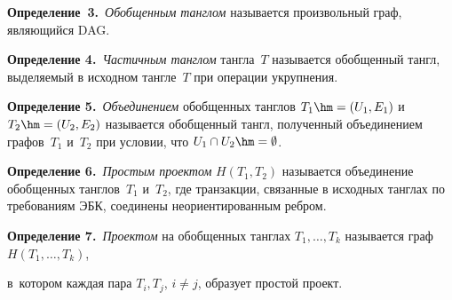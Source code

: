   \noindent


  \textbf{Определение~3.}\ \textit{Обобщенным танглом} называется произвольный граф, яв\-ля\-ющий\-ся DAG. 


  


  \smallskip


  


  \noindent


  \textbf{Определение 4.}\ \textit{Частичным танглом} тангла~$T$ называется обобщенный тангл, выделяемый в исходном тангле~$T$ при операции укрупнения.


  


  \smallskip


  


  \noindent


  \textbf{Определение 5.}\ \textit{Объединением} обобщенных танглов $T_1\hm= (U_1, E_1)$ и $T_2\hm= (U_2, E_2)$ называется обобщенный тангл, полученный объединением графов~$T_1$ и~$T_2$ при условии, что $U_1\cap U_2\hm= \emptyset$. 


  


  \smallskip


  


  \noindent


  \textbf{Определение 6.}\ \textit{Простым проектом} $H(T_1, T_2)$ называется объединение обобщенных танглов~$T_1$ и~$T_2$, где транзакции, связанные в исходных танглах по требованиям ЭБК, соединены неориентированным ребром.


  


  \smallskip


  


  \noindent


  \textbf{Определение 7.}\ \textit{Проектом} на обобщенных танглах $T_1,\ldots , T_k$ называется граф~$H(T_1,\ldots, T_k)$, 


  в~котором каждая пара $T_i, T_j$, $i\not= j$, образует простой проект. 


  


  \smallskip


  


  \noindent


